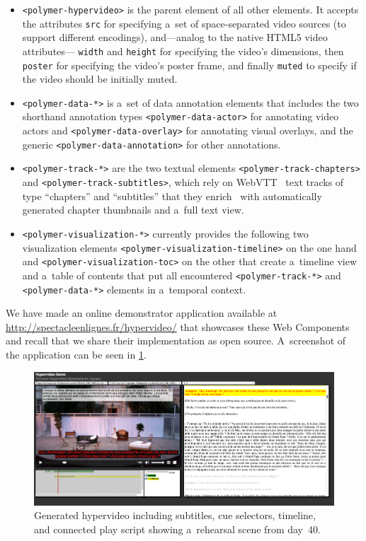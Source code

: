 \documentclass[conference]{IEEEtran}
\begin{document}
\begin{itemize}
  \item \texttt{<polymer-hypervideo>} is the parent element of all other elements.
    It accepts the attributes \texttt{src} for specifying a~set of
    space-separated video sources (to support different encodings),
    and---analog to the native HTML5 video attributes---%
    \texttt{width} and \texttt{height} for specifying the video's dimensions,
    then \texttt{poster} for specifying the video's poster frame, and finally \texttt{muted} to specify if the video should be initially muted.
  \item \texttt{<polymer-data-*>} is a~set of data annotation elements
    that includes the two shorthand annotation types
    \texttt{<polymer-data-actor>} for annotating video actors and
    \texttt{<polymer-data-overlay>} for annotating visual overlays,
    and the generic \texttt{<polymer-data-annotation>} for other annotations.
  \item \texttt{<polymer-track-*>} are the two textual elements
    \texttt{<polymer-track-chapters>} and \texttt{<polymer-track-subtitles>},
    which rely on WebVTT~\cite{pfeiffer2013webvtt} text tracks
    of type ``chapters'' and ``subtitles'' that they enrich~\cite{steiner2014webvtt} with
    automatically generated chapter thumbnails and a~full text view.
  \item \texttt{<polymer-visualization-*>} currently provides the
    following two visualization elements
    \texttt{<polymer-visualization-timeline>} on the one hand and 
    \texttt{<polymer-visualization-toc>} on the other
    that create a~timeline view and a~table of contents
    that put all encountered \texttt{<polymer-track-*>}
    and \texttt{<polymer-data-*>} elements in a~temporal context.
\end{itemize}

\noindent We have made an online demonstrator application available at
\url{http://spectacleenlignes.fr/hypervideo/} that showcases these Web Components
and recall that we share their implementation as open source.
A~screenshot of the application can be seen in \ref{fig:screenshot}.

\begin{figure}[htb!]
  \centering
  \includegraphics[width=0.95\linewidth]{screenshot}
  \caption{Generated hypervideo including subtitles, cue selectors, timeline, and connected play script
    showing a~rehearsal scene from day~40.}
  \label{fig:screenshot}
\end{figure}
\end{document}
